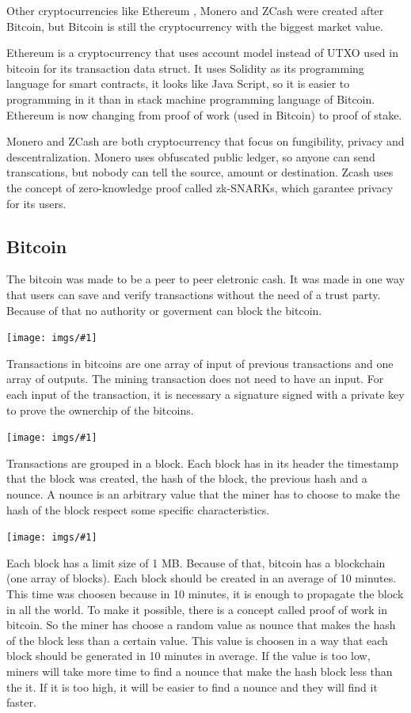 \documentclass[12pt]{article}
\newcommand{\incimg}[1]{\texttt{[image: imgs/\#1]}}
\begin{document}
Other cryptocurrencies like Ethereum \cite{wood2014ethereum}, Monero \cite{noether2015ring} and ZCash \cite{hopwood2016zcash} were created after Bitcoin,
but Bitcoin is still the cryptocurrency with the biggest market value.

Ethereum is a cryptocurrency that uses account model instead of UTXO used in bitcoin for its transaction data struct.
It uses Solidity as its programming language for smart contracts, it looks like Java Script,
so it is easier to programming in it than in stack machine programming language of Bitcoin.
Ethereum is now changing from proof of work (used in Bitcoin) to proof of stake.

Monero and ZCash are both cryptocurrency that focus on fungibility, privacy and descentralization.
Monero uses obfuscated public ledger, so anyone can send transcations, but nobody can tell the source, amount or destination.
Zcash uses the concept of zero-knowledge proof called zk-SNARKs, which garantee privacy for its users.

\subsection{Bitcoin}

The bitcoin was made to be a peer to peer eletronic cash.
It was made in one way that users can save and verify transactions without the need of a trust party.
Because of that no authority or goverment can block the bitcoin.

\incimg{transactions1.png}

Transactions in bitcoins are one array of input of previous transactions and one array of outputs.
The mining transaction does not need to have an input.
For each input of the transaction, it is necessary a signature signed with a private key to prove the ownerchip of the bitcoins.

\incimg{transactions2.jpg}

Transactions are grouped in a block.
Each block has in its header the timestamp that the block was created, the hash of the block,
the previous hash and a nounce.
A nounce is an arbitrary value that the miner has to choose to make the hash of the block respect some specific characteristics.

\incimg{blockchain.png}

Each block has a limit size of 1 MB.
Because of that, bitcoin has a blockchain (one array of blocks).
Each block should be created in an average of 10 minutes.
This time was choosen because in 10 minutes, it is enough to propagate the block in all the world.
To make it possible, there is a concept called proof of work in bitcoin.
So the miner has choose a random value as nounce that makes the hash of the block less than a certain value.
This value is choosen in a way that each block should be generated in 10 minutes in average.
If the value is too low, miners will take more time to find a nounce that make the hash block less than the it.
If it is too high, it will be easier to find a nounce and they will find it faster.
\end{document}

